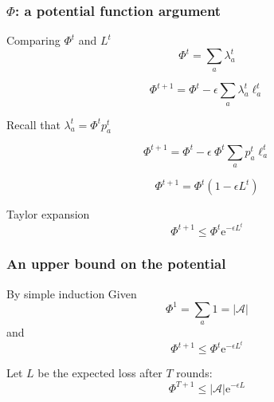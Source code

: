 \documentclass{beamer}
\begin{document}
\begin{frame}
    \frametitle{$\Phi$: a potential function argument}

    \begin{block}{Comparing $\Phi^t$ and $L^t$}
    \begin{equation*}
    \Phi^t = \sum_a \lambda_a^t
    \end{equation*}

    \begin{equation*}
    \Phi^{t+1}  = \Phi^t - \epsilon \sum_a \lambda_a^t \ell_a^t 
    \end{equation*}

    Recall that $\lambda_a^t = \Phi^t p_a^t$

    \begin{equation*}
    \Phi^{t+1} = \Phi^t - \epsilon~\Phi^t \sum_a p_a^t \ell_a^t
    \end{equation*}

    \begin{equation*}
    \Phi^{t+1} = \Phi^t (1 - \epsilon L^t)
    \end{equation*}
    \end{block}

    \begin{block}{Taylor expansion}
    \begin{equation*}
        \Phi^{t+1} \leq \Phi^t \mathrm{e}^{- \epsilon L^t}
    \end{equation*}
    \end{block}

\end{frame}

\begin{frame}
    \frametitle{An upper bound on the potential}

    \begin{block}{By simple induction}
    Given
    \begin{equation*}
        \Phi^1 = \sum_a 1 = |\mathcal{A}|
    \end{equation*}
    and
    \begin{equation*}
        \Phi^{t+1} \leq \Phi^t \mathrm{e}^{- \epsilon L^t}
    \end{equation*}

    Let $L$ be the expected loss after $T$ rounds:
    \alert{\begin{equation*}
            \Phi^{T+1} \leq |\mathcal{A}| \mathrm{e}^{- \epsilon L}
    \end{equation*}}
    \end{block}

\end{frame}
\end{document}
